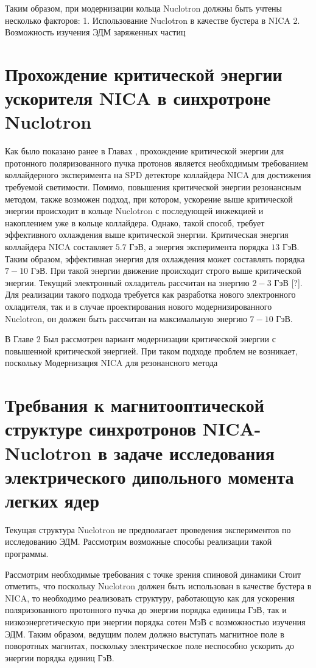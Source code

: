 Таким образом, при модернизации кольца Nuclotron должны быть учтены несколько факторов:
1. Использование Nuclotron в качестве бустера в NICA
2. Возможность изучения ЭДМ заряженных частиц

	\section{Прохождение критической энергии ускорителя NICA в синхротроне Nuclotron}\label{sec:EDM/nuclotron}

\par Как было показано ранее в Главах , прохождение критической энергии для протонного поляризованного пучка протонов является необходимым требованием коллайдерного эксперимента на SPD детекторе коллайдера NICA для достижения требуемой светимости. Помимо, повышения критической энергии резонансным методом, также возможен подход, при котором, ускорение выше критической энергии происходит в кольце Nuclotron с последующей инжекцией и накоплением уже в кольце коллайдера. Однако, такой способ, требует эффективного охлаждения выше критической энергии. Критическая энергия коллайдера NICA составляет $5.7$ ГэВ, а энергия эксперимента порядка $13$ ГэВ. Таким образом, эффективная энергия для охлаждения может составлять порядка $7-10$ ГэВ. При такой энергии движение происходит строго выше критической энергии. Текущий электронный охладитель рассчитан на энергию $2-3$ ГэВ [?]. Для реализации такого подхода требуется как разработка нового электронного охладителя, так и в случае проектирования нового модернизированного Nuclotron, он должен быть рассчитан на максимальную энергию $7-10$ ГэВ.

\par В Главе 2 Был рассмотрен вариант модернизации критической энергии с повышенной критической энергией. При таком подходе проблем не возникает, поскольку Модернизация NICA для резонансного метода

	\section{Требвания к магнитооптической структуре синхротронов NICA-Nuclotron в задаче исследования электрического дипольного момента легких ядер}\label{sec:EDM/requirements}

\par Текущая структура Nuclotron не предполагает проведения экспериментов по исследованию ЭДМ. Рассмотрим возможные способы реализации такой программы.

Рассмотрим необходимые требования с точке зрения спиновой динамики
Стоит отметить, что поскольку Nuclotron должен быть использован в качестве бустера в NICA, то необходимо реализовать структуру, работающую как для ускорения поляризованного протонного пучка до энергии порядка единицы ГэВ, так и низкоэнергетическую при энергии порядка сотен МэВ с возможностью изучения ЭДМ. Таким образом, ведущим полем должно выступать магнитное поле в поворотных магнитах, поскольку электрическое поле неспособно ускорить до энергии порядка единиц ГэВ. 

